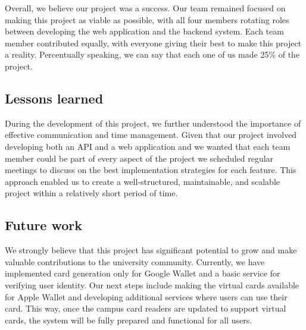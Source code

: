 \documentclass[12pt]{article}
\begin{document}
Overall, we believe our project was a success. Our team remained focused on making this project as viable as possible,
with all four members rotating roles between developing the web application and the backend system. Each team member contributed
equally, with everyone giving their best to make this project a reality. Percentually speaking, we can say that each one of us
made 25\% of the project.

\subsection{Lessons learned}

During the development of this project, we further understood
the importance of effective communication and time management. Given that
our project involved developing both an API and a web application and we wanted
that each team member could be part of every aspect of the project
we scheduled regular meetings to discuss on the best implementation strategies for each feature.
This approach enabled us to create a well-structured, maintainable, and scalable project within a
relatively short period of time.

\subsection{Future work}

We strongly believe that this project has significant potential to grow and make
valuable contributions to the university community. Currently, we have implemented
card generation only for Google Wallet and a basic service for verifying user identity. Our
next steps include making the virtual cards available for Apple Wallet and developing
additional services where users can use their card. This way, once the campus
card readers are updated to support virtual cards, the system will be fully prepared and
functional for all users.




\end{document}
